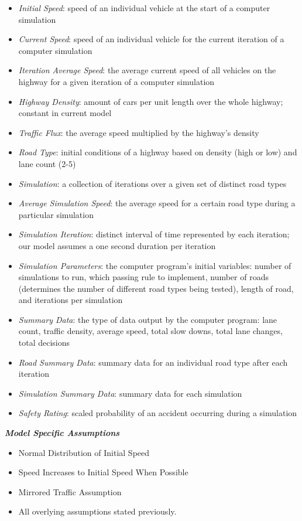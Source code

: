 \documentclass{amsart}
\begin{document}
\begin{itemize}
	\item \textit{Initial Speed}: speed of an individual vehicle at the start of a computer simulation
	\item \textit{Current Speed}: speed of an individual vehicle for the current iteration of a computer simulation
	\item \textit{Iteration Average Speed}: the average current speed of all vehicles on the highway for a given iteration of a computer simulation
	\item \textit{Highway Density}: amount of cars per unit length over the whole highway; constant in current model
	\item \textit{Traffic Flux}: the average speed multiplied by the highway's density
	\item \textit{Road Type}: initial conditions of a highway based on density (high or low) and lane count (2-5)
	\item \textit{Simulation}: a collection of iterations over a given set of distinct road types
	\item \textit{Average Simulation Speed}: the average speed for a certain road type during a particular simulation
	\item \textit{Simulation Iteration}: distinct interval of time represented by each iteration; our model assumes a one second duration per iteration 
	\item \textit{Simulation Parameters}: the computer program's initial variables: number of simulations to run, which passing rule to implement, number of roads (determines the number of different road types being tested), length of road, and iterations per simulation
	\item \textit{Summary Data}: the type of data output by the computer program: lane count, traffic density, average speed, total slow downs, total lane changes, total decisions
	\item \textit{Road Summary Data}: summary data for an individual road type after each iteration
	\item \textit{Simulation Summary Data}: summary data for each simulation
	\item \textit{Safety Rating}: scaled probability of an accident occurring during a simulation
	
\end{itemize}
	
\textit{\textbf{Model Specific Assumptions}}

	\begin{itemize}
	\item Normal Distribution of Initial Speed
	\item Speed Increases to Initial Speed When Possible
	\item Mirrored Traffic Assumption	
	\item All overlying assumptions stated previously.
	
\end{itemize}
\end{document}
